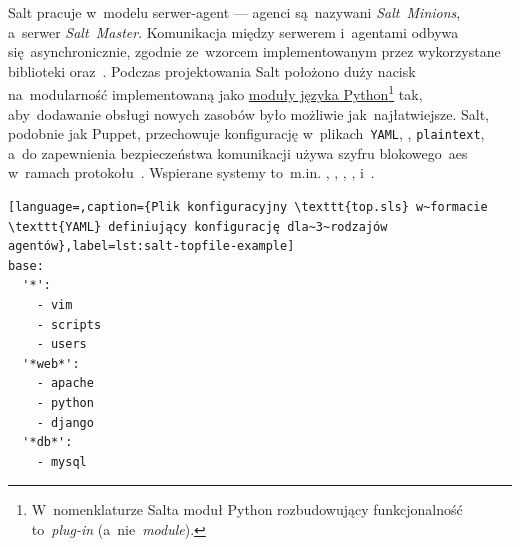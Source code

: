 \documentclass[thesis]{subfiles}
\begin{document}
Salt pracuje w~modelu serwer-agent --- agenci są~nazywani \emph{Salt~Minions}, a~serwer \emph{Salt~Master}. Komunikacja między serwerem i~agentami odbywa się~asynchronicznie, zgodnie ze~wzorcem  implementowanym przez wykorzystane biblioteki  oraz~. Podczas projektowania Salt położono duży nacisk na~modularność implementowaną jako \href{https://docs.python.org/dev/tutorial/modules.html}{moduły języka Python}\footnote{W~nomenklaturze Salta moduł Python rozbudowujący funkcjonalność to~\emph{plug-in} (a~nie~\emph{module}).} tak, aby~dodawanie obsługi nowych zasobów było możliwie jak~najłatwiejsze. Salt, podobnie jak Puppet, przechowuje konfigurację w~plikach~\texttt{YAML}, \json{}, \texttt{plaintext}, a~do zapewnienia bezpieczeństwa komunikacji używa szyfru blokowego~\gls{aes} w~ramach protokołu~. Wspierane systemy to~m.in. \emph{}, , , ,  i~.

\begin{lstlisting}[language=,caption={Plik konfiguracyjny \texttt{top.sls} w~formacie \texttt{YAML} definiujący konfigurację dla~3~rodzajów agentów},label=lst:salt-topfile-example]
base:
  '*':
    - vim
    - scripts
    - users
  '*web*':
    - apache
    - python
    - django
  '*db*':
    - mysql
\end{lstlisting}
\end{document}
